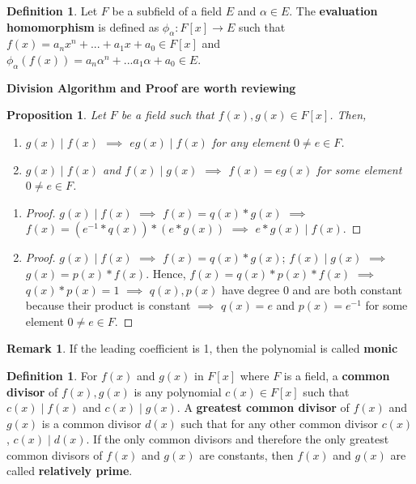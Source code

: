 \documentclass[11pt]{article}
\newtheorem{prop}[thm]{Proposition}
\theoremstyle{definition}
\newtheorem{definition}[thm]{Definition}
\newtheorem{remark}[thm]{Remark}
\numberwithin{equation}{section}
\begin{document}
 \begin{definition}
 Let $F$ be a subfield of a field $E$ and $\alpha \in E$. The \textbf{evaluation homomorphism} is defined as $\phi_{\alpha}: F[x] \rightarrow E$ such that $f(x) = a_{n}x^{n}+...+a_{1}x+a_{0} \in F[x]$ and $\phi_{\alpha}(f(x)) = a_{n}\alpha^{n}+...a_{1}\alpha+a_{0} \in E$.
 \end{definition}

 \textbf{Division Algorithm and Proof are worth reviewing}

 \begin{prop}
  Let $F$ be a field such that $f(x), g(x) \in F[x]$. Then,
  \begin{enumerate}
      \item $g(x) \mid f(x)$ $\implies$ $eg(x) \mid f(x)$ for any element $0 \neq e \in F$.
      \item $g(x) \mid f(x)$ and $f(x) \mid g(x)$ $\implies$ $f(x) = eg(x)$ for some element $0 \neq e \in F$.
  \end{enumerate}
 \end{prop}

\begin{enumerate}
    \item
    \begin{proof}
    $g(x) \mid f(x)$ $\implies$ $f(x) = q(x)*g(x)$ $\implies$ $f(x) = (e^{-1}*q(x))*(e*g(x))$ $\implies$ $e*g(x) \mid f(x)$.
    \end{proof}
    \item
    \begin{proof}
    $g(x) \mid f(x)$ $\implies$ $f(x) = q(x)*g(x)$; $f(x) \mid g(x)$ $\implies$ $g(x) = p(x)*f(x)$. Hence, $f(x) = q(x)*p(x)*f(x)$ $\implies$ $q(x)*p(x) = 1$ $\implies$ $q(x), p(x)$ have degree $0$ and are both constant because their product is constant $\implies$ $q(x) = e$ and $p(x) = e^{-1}$ for some element $0 \neq e \in F$.
    \end{proof}
\end{enumerate}

\begin{remark}
If the leading coefficient is 1, then the polynomial is called \textbf{monic}
\end{remark}

\begin{definition}
For $f(x)$ and $g(x)$ in $F[x]$ where $F$ is a field, a \textbf{common divisor} of $f(x), g(x)$ is any polynomial $c(x) \in F[x]$ such that $c(x) \mid f(x)$ and $c(x) \mid g(x)$. A \textbf{greatest common divisor} of $f(x)$ and $g(x)$ is a common divisor $d(x)$ such that for any other common divisor $c(x)$, $c(x) \mid d(x)$. If the only common divisors and therefore the only greatest common divisors of $f(x)$ and $g(x)$ are constants, then $f(x)$ and $g(x)$ are called \textbf{relatively prime}.
\end{definition}
\end{document}
